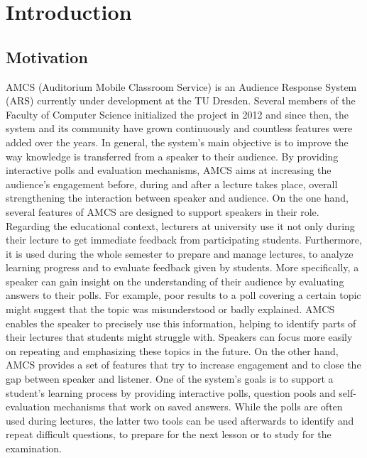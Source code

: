 
\chapter{Introduction}

\section{Motivation}


AMCS (Auditorium Mobile Classroom Service) is an Audience Response System (ARS) currently under development at the TU Dresden. Several members of the Faculty of Computer Science initialized the project in 2012 and since then, the system and its community have grown continuously and countless features were added over the years.
\newline
\newline
In general, the system's main objective is to improve the way knowledge is transferred from a speaker to their audience. By providing interactive polls and evaluation mechanisms, AMCS aims at increasing the audience's engagement before, during and after a lecture takes place, overall strengthening the interaction between speaker and audience.
\newline
\newline
On the one hand, several features of AMCS are designed to support speakers in their role. Regarding the educational context, lecturers at university use it not only during their lecture to get immediate feedback from participating students. Furthermore, it is used during the whole semester to prepare and manage lectures, to analyze learning progress and to evaluate feedback given by students. More specifically, a speaker can gain insight on the understanding of their audience by evaluating answers to their polls. For example, poor results to a poll covering a certain topic might suggest that the topic was misunderstood or badly explained. AMCS enables the speaker to precisely use  this information, helping to identify parts of their lectures that students might struggle with. Speakers can focus more easily on repeating and emphasizing these topics in the future.
\newline
\newline
On the other hand, AMCS provides a set of features that try to increase engagement and to close the gap between speaker and listener.
One of the system's goals is to support a student's learning process by providing interactive polls, question pools and self-evaluation mechanisms that work on saved answers. While the polls are often used during lectures, the latter two tools can be used afterwards to identify and repeat difficult questions, to prepare for the next lesson or to study for the examination. 

